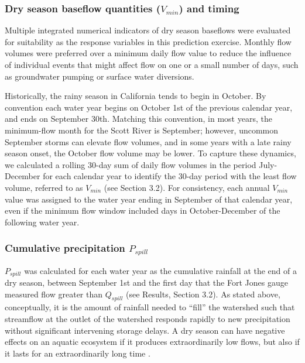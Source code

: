 \documentclass[hess, manuscript]{copernicus}
\begin{document}
\subsubsection{\texorpdfstring{Dry season baseflow quantities
(\(V_{min}\)) and
timing}{Dry season baseflow quantities (V\_\{min\}) and timing}}

Multiple integrated numerical indicators of dry season baseflows were
evaluated for suitability as the response variables in this prediction
exercise. Monthly flow volumes were preferred over a minimum daily flow
value to reduce the influence of individual events that might affect
flow on one or a small number of days, such as groundwater pumping or
surface water diversions.

Historically, the rainy season in California tends to begin in October.
By convention each water year begins on October 1st of the previous
calendar year, and ends on September 30th. Matching this convention, in
most years, the minimum-flow month for the Scott River is September;
however, uncommon September storms can elevate flow volumes, and in some
years with a late rainy season onset, the October flow volume may be
lower. To capture these dynamics, we calculated a rolling 30-day sum of
daily flow volumes in the period July-December for each calendar year to
identify the 30-day period with the least flow volume, referred to as
\(V_{min}\) (see Section 3.2). For consistency, each annual \(V_{min}\)
value was assigned to the water year ending in September of that
calendar year, even if the minimum flow window included days in
October-December of the following water year.

\subsubsection{\texorpdfstring{Cumulative precipitation
\(P_{spill}\)}{Cumulative precipitation P\_\{spill\}}}

\(P_{spill}\) was calculated for each water year as the cumulative
rainfall at the end of a dry season, between September 1st and the first
day that the Fort Jones gauge measured flow greater than \(Q_{spill}\)
(see Results, Section 3.2). As stated above, conceptually, it is the
amount of rainfall needed to ``fill'' the watershed such that streamflow
at the outlet of the watershed responds rapidly to new precipitation
without significant intervening storage delays. A dry season can have
negative effects on an aquatic ecosystem if it produces extraordinarily
low flows, but also if it lasts for an extraordinarily long time
\citeyearpar[e.g., delayed salmon habitat access, CDFW][]{CDFW2015a}.
\end{document}
